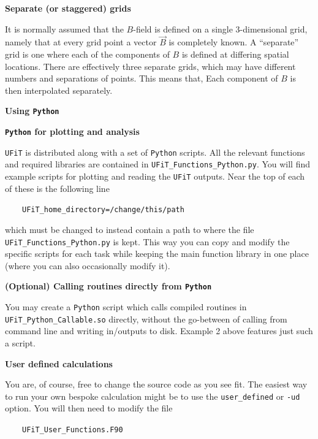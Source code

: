 \documentclass[12pt,twoside]{article}
\begin{document}
{\large \textbf{Separate (or staggered) grids}}

It is normally assumed that the $B$-field is defined on a single 3-dimensional grid, namely that at every grid point a vector $\vec{B}$ is completely known. A ``separate'' grid is one where each of the components of $B$ is defined at differing spatial locations. There are effectively three separate grids, which may have different numbers and separations of points. This means that, 
Each component of $B$ is then interpolated separately.


\vspace{2mm}
{\Large \textbf{Using \texttt{Python}}}

\vspace{2mm}
{\large \textbf{\texttt{Python} for plotting and analysis}}

\texttt{UFiT} is distributed along with a set of \texttt{Python} scripts. All the relevant functions and required libraries are contained in \texttt{UFiT\_Functions\_Python.py}. You will find example scripts for plotting and reading the \texttt{UFiT} outputs. Near the top of each of these is the following line

$\quad\quad$\texttt{UFiT\_home\_directory=\textquotesingle /change/this/path\textquotesingle }

which must be changed to instead contain a path to where the file \texttt{UFiT\_Functions\_Python.py} is kept. This way you can copy and modify the specific scripts for each task while keeping the main function library in one place (where you can also occasionally modify it).


\vspace{2mm}
{\large \textbf{(Optional) Calling routines directly from \texttt{Python}}}

You may create a \texttt{Python} script which calls compiled routines in \texttt{UFiT\_Python\_Callable.so} directly, without the go-between of calling from command line and writing in/outputs to disk. Example 2 above features just such a script.


\vspace{3mm}
{\Large \textbf{User defined calculations}}

You are, of course, free to change the source code as you see fit. The easiest way to run your own bespoke calculation might be to use the \texttt{user\_defined} or \texttt{-ud} option. You will then need to modify the file 

$\quad\quad$\texttt{UFiT\_User\_Functions.F90}
\end{document}
